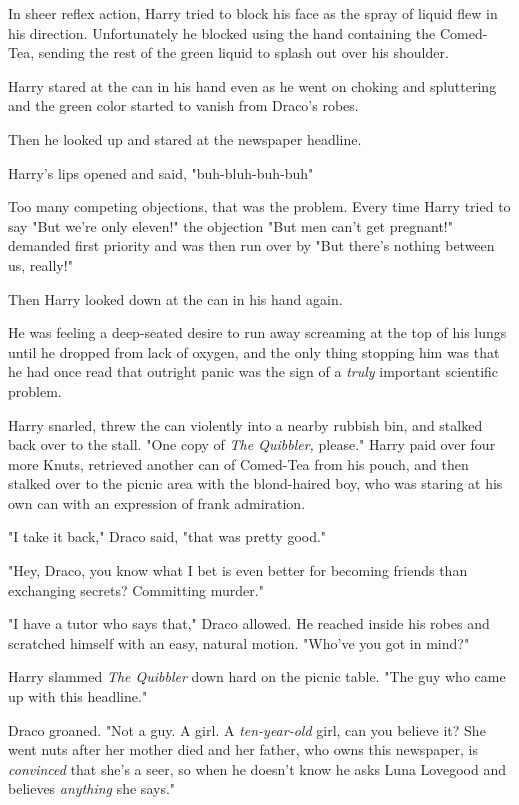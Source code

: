 In sheer reflex action, Harry tried to block his face as the spray of liquid
flew in his direction. Unfortunately he blocked using the hand containing the
Comed-Tea, sending the rest of the green liquid to splash out over his shoulder.

Harry stared at the can in his hand even as he went on choking and spluttering
and the green color started to vanish from Draco's robes.

Then he looked up and stared at the newspaper headline.


Harry's lips opened and said, "buh-bluh-buh-buh{\el}"

Too many competing objections, that was the problem. Every time Harry tried to
say "But we're only eleven!" the objection "But men can't get pregnant!"
demanded first priority and was then run over by "But there's nothing between
us, really!"

Then Harry looked down at the can in his hand again.

He was feeling a deep-seated desire to run away screaming at the top of his
lungs until he dropped from lack of oxygen, and the only thing stopping him was
that he had once read that outright panic was the sign of a \emph{truly}
important scientific problem.

Harry snarled, threw the can violently into a nearby rubbish bin, and stalked
back over to the stall. "One copy of \emph{The Quibbler,} please." Harry paid
over four more Knuts, retrieved another can of Comed-Tea from his pouch, and
then stalked over to the picnic area with the blond-haired boy, who was staring
at his own can with an expression of frank admiration.

"I take it back," Draco said, "that was pretty good."

"Hey, Draco, you know what I bet is even better for becoming friends than
exchanging secrets? Committing murder."

"I have a tutor who says that," Draco allowed. He reached inside his robes and
scratched himself with an easy, natural motion. "Who've you got in mind?"

Harry slammed \emph{The Quibbler} down hard on the picnic table. "The guy who
came up with this headline."

Draco groaned. "Not a guy. A girl. A \emph{ten-year-old} girl, can you believe
it? She went nuts after her mother died and her father, who owns this
newspaper, is \emph{convinced} that she's a seer, so when he doesn't know he
asks Luna Lovegood and believes \emph{anything} she says."

